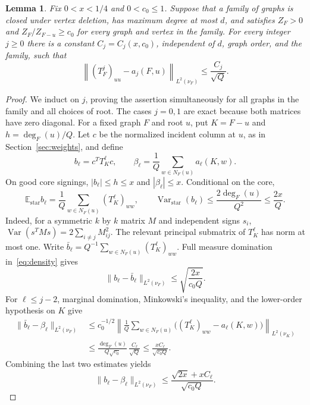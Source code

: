\documentclass[11pt]{article}
\numberwithin{equation}{section}
\newtheorem{lemma}[theorem]{Lemma}
\theoremstyle{remark}
\newcommand{\E}{\mathbb E}
\begin{document}
\begin{lemma}\label{lem:moments}
Fix $0<x<1/4$ and $0<c_0\le1$. Suppose that a family of graphs is closed
under vertex deletion, has maximum degree at most $d$, and satisfies
$Z_F>0$ and $Z_F/Z_{F-u}\ge c_0$ for every graph and vertex in the
family. For every integer $j\ge0$ there is a constant $C_j=C_j(x,c_0)$,
independent of $d$, graph order, and the family, such that
\[
 \left\|(T_F^j)_{uu}-a_j(F,u)\right\|_{L^2(\nu_F)}
 \le \frac{C_j}{\sqrt Q}.
\]
\end{lemma}
\begin{proof}
We induct on $j$, proving the assertion simultaneously for all
graphs in the family and all choices of root. The cases $j=0,1$
are exact because both matrices have zero diagonal.
For a fixed graph $F$ and root $u$, put $K=F-u$ and
$h=\deg_F(u)/Q$. Let $c$ be the normalized incident column
at $u$, as in Section~\ref{sec:weights}, and define
\[
 b_\ell=c^TT_K^\ell c,\qquad
 \beta_\ell=\frac1Q\sum_{w\in N_F(u)}a_\ell(K,w).
\]
On good core signings, $|b_\ell|\le h\le x$ and
$|\beta_\ell|\le x$. Conditional on the core,
\[
 \E_{\mathrm{star}}b_\ell
 =\frac1Q\sum_{w\in N_F(u)}(T_K^\ell)_{ww},\qquad
 \operatorname{Var}_{\mathrm{star}}(b_\ell)
 \le\frac{2\deg_F(u)}{Q^2}\le\frac{2x}{Q}.
\]
Indeed, for a symmetric $k$ by $k$ matrix $M$ and independent signs
$s_i$, $\operatorname{Var}(s^TMs)=2\sum_{i\ne j}M_{ij}^2$.
The relevant principal submatrix of $T_K^\ell$ has norm at most one.
Write
$\bar b_\ell=Q^{-1}\sum_{w\in N_F(u)}(T_K^\ell)_{ww}$.
Full measure domination in~\eqref{eq:density} gives
\[
 \|b_\ell-\bar b_\ell\|_{L^2(\nu_F)}
 \le \sqrt{\frac{2x}{c_0Q}}.
\]
For $\ell\le j-2$, marginal domination, Minkowski's inequality,
and the lower-order hypothesis on $K$ give
\begin{align*}
 \|\bar b_\ell-\beta_\ell\|_{L^2(\nu_F)}
 &\le c_0^{-1/2}
 \left\|\frac1Q\sum_{w\in N_F(u)}
       \bigl((T_K^\ell)_{ww}-a_\ell(K,w)\bigr)
 \right\|_{L^2(\nu_K)}\\
 &\le\frac{\deg_F(u)}{Q\sqrt{c_0}}\,
       \frac{C_\ell}{\sqrt Q}
 \le\frac{xC_\ell}{\sqrt{c_0Q}}.
\end{align*}
Combining the last two estimates yields
\begin{equation}\label{eq:b-moment}
 \|b_\ell-\beta_\ell\|_{L^2(\nu_F)}
 \le\frac{\sqrt{2x}+xC_\ell}{\sqrt{c_0Q}}.
\end{equation}


\end{proof}
\end{document}
